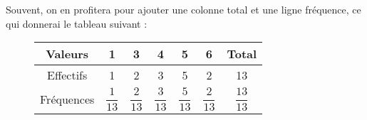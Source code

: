 Souvent, on en profitera pour ajouter une colonne total et une ligne fréquence, ce qui donnerai le tableau suivant :

\begin{figure}[H]
    \center
    \begin{tabular}{c*{6}{|c}}
        Valeurs & 1 & 3 & 4 &5 & 6 & Total \\ \hline
        Effectifs & 1 & 2 & 3 & 5 & 2 & 13\\ \hline
        Fréquences &$\dfrac{1}{13}$ & $\dfrac{2}{13}$  & $\dfrac{3}{13}$  & $\dfrac{5}{13}$  & $\dfrac{2}{13}$  & $\dfrac{13}{13}$ 
    \end{tabular}
\end{figure}